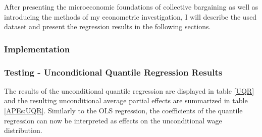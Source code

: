 After presenting the microeconomic foundations of collective bargaining as well as introducing the methods of my econometric investigation, I will describe the used dataset and present the regression results in the following sections.

\subsubsection{Implementation}

\subsubsection{Testing - Unconditional Quantile Regression Results}

The results of the unconditional quantile regression are displayed in table \ref{UQR} and the resulting unconditional average partial effects are summarized in table \ref{APEs:UQR}. Similarly to the OLS regression, the coefficients of the quantile regression can now be interpreted as effects on the unconditional wage distribution.

